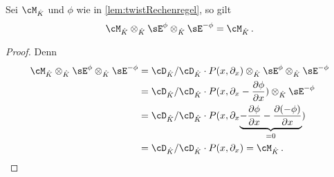 \begin{cor} \label{cor:zurücktwisten}
Sei $\cM_{\hat K}$ und $\phi$ wie in \ref{lem:twistRechenregel}, so gilt
\[
\cM_{\hat K}\otimes_{\hat K}\sE^{\phi}\otimes_{\hat K}\sE^{-\phi}=\cM_{\hat K}\,.
\]
\end{cor}
\begin{proof}
Denn
\begin{align*}
\cM_{\hat K}\otimes_{\hat K}\sE^{\phi}\otimes_{\hat K}\sE^{-\phi}
  &= \cD_{\hat K}/\cD_{\hat K}\cdot P(x,\partial_x)
    \otimes_{\hat K}\sE^{\phi}\otimes_{\hat K}\sE^{-\phi}
\\&= \cD_{\hat K}/\cD_{\hat K}
  \cdot P(x,\partial_x-\frac{\partial \phi}{\partial x})
  \otimes_{\hat K}\sE^{-\phi}
\\&= \cD_{\hat K}/\cD_{\hat K} \cdot P(x,\partial_x\underset{=0}{\underbrace{
  -\frac{\partial \phi}{\partial x} -\frac{\partial (-\phi)}{\partial x}}})
\\&= \cD_{\hat K}/\cD_{\hat K} \cdot P(x,\partial_x) = \cM_{\hat K} \,.
\end{align*}
\end{proof}


